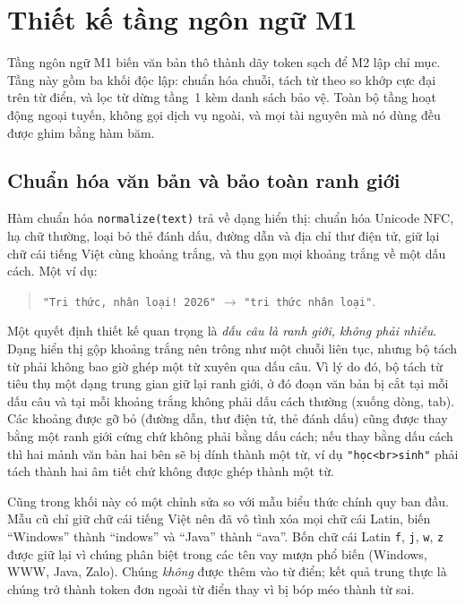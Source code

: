\section{Thiết kế tầng ngôn ngữ M1}
\label{sec:m1-thiet-ke}

Tầng ngôn ngữ M1 biến văn bản thô thành dãy token sạch để M2 lập chỉ mục. Tầng này
gồm ba khối độc lập: chuẩn hóa chuỗi, tách từ theo so khớp cực đại trên từ điển, và
lọc từ dừng tầng~1 kèm danh sách bảo vệ. Toàn bộ tầng hoạt động ngoại tuyến, không
gọi dịch vụ ngoài, và mọi tài nguyên mà nó dùng đều được ghim bằng hàm băm.

\subsection{Chuẩn hóa văn bản và bảo toàn ranh giới}

Hàm chuẩn hóa \texttt{normalize(text)} trả về dạng hiển thị: chuẩn hóa Unicode
NFC, hạ chữ thường, loại bỏ thẻ đánh dấu, đường dẫn và địa chỉ thư điện tử, giữ
lại chữ cái tiếng Việt cùng khoảng trắng, và thu gọn mọi khoảng trắng về một dấu
cách. Một ví dụ:

\begin{quote}
\texttt{"Tri thức, nhân loại! 2026"} $\rightarrow$ \texttt{"tri thức nhân loại"}.
\end{quote}

Một quyết định thiết kế quan trọng là \emph{dấu câu là ranh giới, không phải
nhiễu}. Dạng hiển thị gộp khoảng trắng nên trông như một chuỗi liên tục, nhưng bộ
tách từ phải không bao giờ ghép một từ xuyên qua dấu câu. Vì lý do đó, bộ tách từ
tiêu thụ một dạng trung gian giữ lại ranh giới, ở đó đoạn văn bản bị cắt tại mỗi
dấu câu và tại mỗi khoảng trắng không phải dấu cách thường (xuống dòng, tab). Các
khoảng được gỡ bỏ (đường dẫn, thư điện tử, thẻ đánh dấu) cũng được thay bằng một
ranh giới cứng chứ không phải bằng dấu cách; nếu thay bằng dấu cách thì hai mảnh
văn bản hai bên sẽ bị dính thành một từ, ví dụ \texttt{"học<br>sinh"} phải tách
thành hai âm tiết chứ không được ghép thành một từ.

Cũng trong khối này có một chỉnh sửa so với mẫu biểu thức chính quy ban đầu. Mẫu
cũ chỉ giữ chữ cái tiếng Việt nên đã vô tình xóa mọi chữ cái Latin, biến
``Windows'' thành ``indows'' và ``Java'' thành ``ava''. Bốn chữ cái Latin
\texttt{f}, \texttt{j}, \texttt{w}, \texttt{z} được giữ lại vì chúng phân biệt
trong các tên vay mượn phổ biến (Windows, WWW, Java, Zalo). Chúng \emph{không}
được thêm vào từ điển; kết quả trung thực là chúng trở thành token đơn ngoài từ
điển thay vì bị bóp méo thành từ sai.

